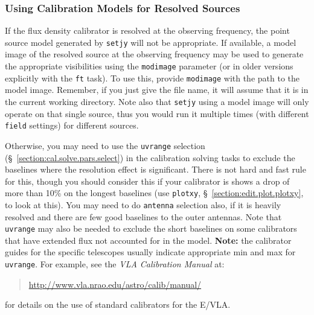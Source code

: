 {\subsubsection{Using Calibration Models for Resolved Sources}
\label{section:cal.prior.models.resolved}

If the flux density calibrator is resolved at the observing frequency,
the point source model generated by {\tt setjy} will not be
appropriate.  If available, a model image of the resolved source at
the observing frequency may be used to generate the appropriate
visibilities using the {\tt modimage} parameter (or in older
versions explicitly with the {\tt ft} task).  To use this, provide
{\tt modimage} with the path to the model image.  Remember, if you
just give the file name, it will assume that it is in the
current working directory.  Note also that {\tt setjy} using a 
model image will only operate on that single source, thus you
would run it multiple times (with different {\tt field} settings)
for different sources.

Otherwise, you may
need to use the {\tt uvrange} selection
(\S~\ref{section:cal.solve.pars.select}) 
in the calibration solving tasks to exclude the baselines
where the resolution effect is significant.  There is not hard
and fast rule for this, though you should consider this if your
calibrator is shows a drop of more than 10\% on the longest baselines
(use {\tt plotxy}, \S~\ref{section:edit.plot.plotxy}, to look at this).
You may need to do {\tt antenna} selection also, if it is heavily
resolved and there are few good baselines to the outer antennas.
Note that {\tt uvrange} may also be needed to exclude the short
baselines on some calibrators that have extended flux not accounted
for in the model.
{\bf Note:} the calibrator guides for the specific telescopes usually
indicate appropriate min and max for {\tt uvrange}. For example,
see the {\em VLA Calibration Manual} at:
\begin{quote}
   \url{http://www.vla.nrao.edu/astro/calib/manual/}
\end{quote}
for details on the use of standard calibrators for the E/VLA.

}
